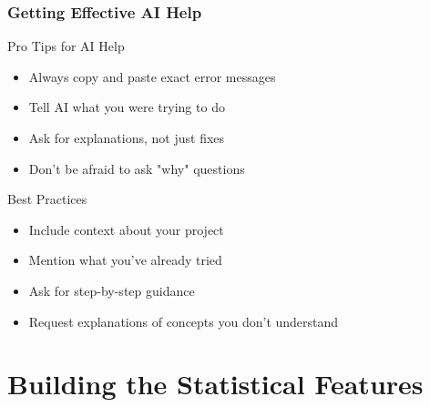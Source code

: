 \documentclass[aspectratio=169]{beamer}
\begin{document}
\begin{frame}
\frametitle{Getting Effective AI Help}
\begin{exampleblock}{Pro Tips for AI Help}
\begin{itemize}
\item Always copy and paste exact error messages
\item Tell AI what you were trying to do
\item Ask for explanations, not just fixes
\item Don't be afraid to ask "why" questions
\end{itemize}
\end{exampleblock}

\begin{alertblock}{Best Practices}
\begin{itemize}
\item Include context about your project
\item Mention what you've already tried
\item Ask for step-by-step guidance
\item Request explanations of concepts you don't understand
\end{itemize}
\end{alertblock}
\end{frame}

\section{Building the Statistical Features}
\end{document}
